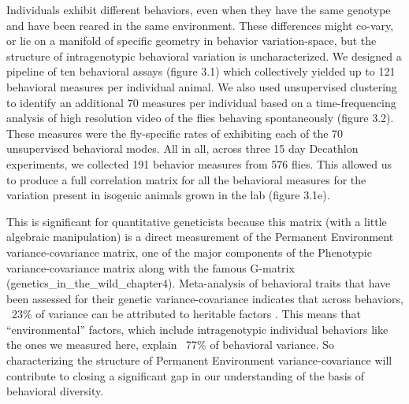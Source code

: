 \documentclass[12pt,letterpaper]{article}
\begin{document}
Individuals exhibit different behaviors, even when they have the same genotype and have been reared in the same environment. These differences might co-vary, or lie on a manifold of specific geometry in behavior variation-space, but the structure of intragenotypic behavioral variation is uncharacterized. We designed a pipeline of ten behavioral assays (figure 3.1) which collectively yielded up to 121 behavioral measures per individual animal. We also used unsupervised clustering to identify an additional 70 measures per individual based on a time-frequencing analysis of high resolution video of the flies behaving spontaneously (figure 3.2). These measures were the fly-specific rates of exhibiting each of the 70 unsupervised behavioral modes. All in all, across three 15 day Decathlon experiments, we collected 191 behavior measures from 576 flies. This allowed us to produce a full correlation matrix for all the behavioral measures for the variation present in isogenic animals grown in the lab (figure 3.1e). 

This is significant for quantitative geneticists because this matrix (with a little algebraic manipulation) is a direct measurement of the Permanent Environment variance-covariance matrix, one of the major components of the Phenotypic variance-covariance matrix along with the famous G-matrix (genetics_in_the_wild_chapter4). Meta-analysis of behavioral traits that have been assessed for their genetic variance-covariance indicates that across behaviors, ~23\% of variance can be attributed to heritable factors \cite{Dochtermann_The_2019}. This means that “environmental” factors, which include intragenotypic individual behaviors like the ones we measured here, explain ~77\% of behavioral variance. So characterizing the structure of Permanent Environment variance-covariance will contribute to closing a significant gap in our understanding of the basis of behavioral diversity.
\end{document}
